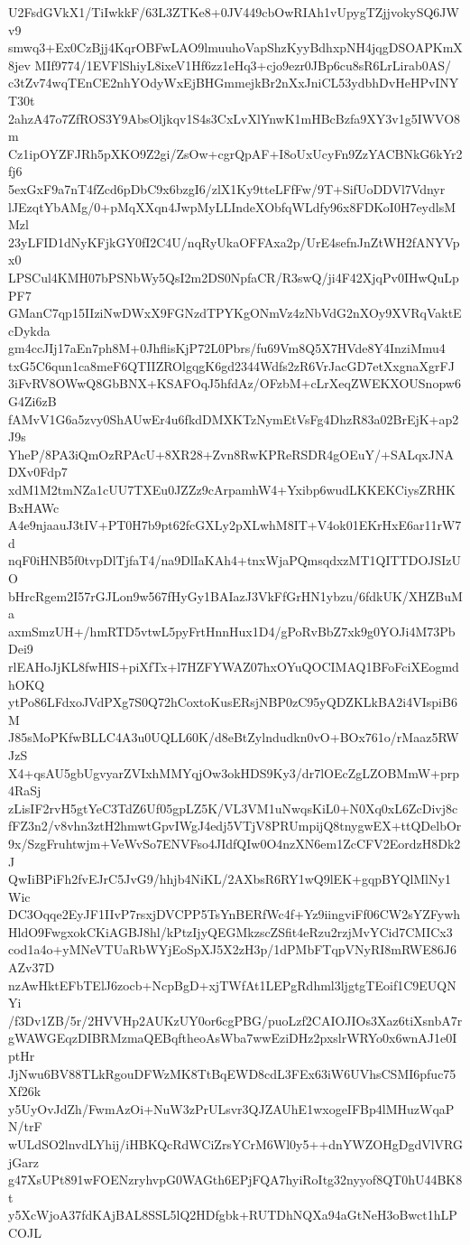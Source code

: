 U2FsdGVkX1/TiIwkkF/63L3ZTKe8+0JV449cbOwRIAh1vUpygTZjjvokySQ6JWv9
smwq3+Ex0CzBjj4KqrOBFwLAO9lmuuhoVapShzKyyBdhxpNH4jqgDSOAPKmX8jev
MIf9774/1EVFlShiyL8ixeV1Hf6zz1eHq3+cjo9ezr0JBp6cu8sR6LrLirab0AS/
c3tZv74wqTEnCE2nhYOdyWxEjBHGmmejkBr2nXxJniCL53ydbhDvHeHPvINYT30t
2ahzA47o7ZfROS3Y9AbsOljkqv1S4s3CxLvXlYnwK1mHBcBzfa9XY3v1g5IWVO8m
Cz1ipOYZFJRh5pXKO9Z2gi/ZsOw+cgrQpAF+I8oUxUcyFn9ZzYACBNkG6kYr2fj6
5exGxF9a7nT4fZcd6pDbC9x6bzgI6/zlX1Ky9tteLFfFw/9T+SifUoDDVl7Vdnyr
lJEzqtYbAMg/0+pMqXXqn4JwpMyLLIndeXObfqWLdfy96x8FDKoI0H7eydlsMMzl
23yLFID1dNyKFjkGY0fI2C4U/nqRyUkaOFFAxa2p/UrE4sefnJnZtWH2fANYVpx0
LPSCul4KMH07bPSNbWy5QsI2m2DS0NpfaCR/R3swQ/ji4F42XjqPv0IHwQuLpPF7
GManC7qp15IIziNwDWxX9FGNzdTPYKgONmVz4zNbVdG2nXOy9XVRqVaktEcDykda
gm4ccJIj17aEn7ph8M+0JhflisKjP72L0Pbrs/fu69Vm8Q5X7HVde8Y4InziMmu4
txG5C6qun1ca8meF6QTIIZROlgqgK6gd2344Wdfs2zR6VrJacGD7etXxgnaXgrFJ
3iFvRV8OWwQ8GbBNX+KSAFOqJ5hfdAz/OFzbM+cLrXeqZWEKXOUSnopw6G4Zi6zB
fAMvV1G6a5zvy0ShAUwEr4u6fkdDMXKTzNymEtVsFg4DhzR83a02BrEjK+ap2J9s
YheP/8PA3iQmOzRPAcU+8XR28+Zvn8RwKPReRSDR4gOEuY/+SALqxJNADXv0Fdp7
xdM1M2tmNZa1cUU7TXEu0JZZz9cArpamhW4+Yxibp6wudLKKEKCiysZRHKBxHAWc
A4e9njaauJ3tIV+PT0H7b9pt62fcGXLy2pXLwhM8IT+V4ok01EKrHxE6ar11rW7d
nqF0iHNB5f0tvpDlTjfaT4/na9DlIaKAh4+tnxWjaPQmsqdxzMT1QITTDOJSIzUO
bHrcRgem2I57rGJLon9w567fHyGy1BAIazJ3VkFfGrHN1ybzu/6fdkUK/XHZBuMa
axmSmzUH+/hmRTD5vtwL5pyFrtHnnHux1D4/gPoRvBbZ7xk9g0YOJi4M73PbDei9
rlEAHoJjKL8fwHIS+piXfTx+l7HZFYWAZ07hxOYuQOCIMAQ1BFoFciXEogmdhOKQ
ytPo86LFdxoJVdPXg7S0Q72hCoxtoKusERsjNBP0zC95yQDZKLkBA2i4VIspiB6M
J85sMoPKfwBLLC4A3u0UQLL60K/d8eBtZylndudkn0vO+BOx761o/rMaaz5RWJzS
X4+qsAU5gbUgvyarZVIxhMMYqjOw3okHDS9Ky3/dr7lOEcZgLZOBMmW+prp4RaSj
zLisIF2rvH5gtYeC3TdZ6Uf05gpLZ5K/VL3VM1uNwqsKiL0+N0Xq0xL6ZcDivj8c
fFZ3n2/v8vhn3ztH2hmwtGpvIWgJ4edj5VTjV8PRUmpijQ8tnygwEX+ttQDelbOr
9x/SzgFruhtwjm+VeWvSo7ENVFso4JIdfQIw0O4nzXN6em1ZcCFV2EordzH8Dk2J
QwIiBPiFh2fvEJrC5JvG9/hhjb4NiKL/2AXbsR6RY1wQ9lEK+gqpBYQlMlNy1Wic
DC3Oqqe2EyJF1IIvP7rsxjDVCPP5TsYnBERfWc4f+Yz9iingviFf06CW2sYZFywh
HldO9FwgxokCKiAGBJ8hl/kPtzIjyQEGMkzscZSfit4eRzu2rzjMvYCid7CMICx3
cod1a4o+yMNeVTUaRbWYjEoSpXJ5X2zH3p/1dPMbFTqpVNyRI8mRWE86J6AZv37D
nzAwHktEFbTElJ6zocb+NcpBgD+xjTWfAt1LEPgRdhml3ljgtgTEoif1C9EUQNYi
/f3Dv1ZB/5r/2HVVHp2AUKzUY0or6cgPBG/puoLzf2CAIOJIOs3Xaz6tiXsnbA7r
gWAWGEqzDIBRMzmaQEBqftheoAsWba7wwEziDHz2pxslrWRYo0x6wnAJ1e0IptHr
JjNwu6BV88TLkRgouDFWzMK8TtBqEWD8cdL3FEx63iW6UVhsCSMI6pfuc75Xf26k
y5UyOvJdZh/FwmAzOi+NuW3zPrULsvr3QJZAUhE1wxogeIFBp4lMHuzWqaPN/trF
wULdSO2lnvdLYhij/iHBKQcRdWCiZrsYCrM6Wl0y5++dnYWZOHgDgdVlVRGjGarz
g47XsUPt891wFOENzryhvpG0WAGth6EPjFQA7hyiRoItg32nyyof8QT0hU44BK8t
y5XcWjoA37fdKAjBAL8SSL5lQ2HDfgbk+RUTDhNQXa94aGtNeH3oBwct1hLPCOJL

